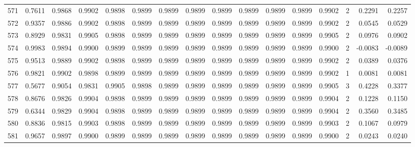 \begin{tabular}{lrrrrrrrrrrrrrrr}
571 &      0.7611 &  0.9868 &  0.9902 &  0.9898 &  0.9899 &  0.9899 &  0.9899 &  0.9899 &  0.9899 &  0.9899 &   0.9899 &     0.9902 &      2 &                    0.2291 &                     0.2257 \\
572 &      0.9357 &  0.9886 &  0.9902 &  0.9898 &  0.9899 &  0.9899 &  0.9899 &  0.9899 &  0.9899 &  0.9899 &   0.9899 &     0.9902 &      2 &                    0.0545 &                     0.0529 \\
573 &      0.8929 &  0.9831 &  0.9905 &  0.9898 &  0.9899 &  0.9899 &  0.9899 &  0.9899 &  0.9899 &  0.9899 &   0.9899 &     0.9905 &      2 &                    0.0976 &                     0.0902 \\
574 &      0.9983 &  0.9894 &  0.9900 &  0.9899 &  0.9899 &  0.9899 &  0.9899 &  0.9899 &  0.9899 &  0.9899 &   0.9899 &     0.9900 &      2 &                   -0.0083 &                    -0.0089 \\
575 &      0.9513 &  0.9889 &  0.9902 &  0.9898 &  0.9899 &  0.9899 &  0.9899 &  0.9899 &  0.9899 &  0.9899 &   0.9899 &     0.9902 &      2 &                    0.0389 &                     0.0376 \\
576 &      0.9821 &  0.9902 &  0.9898 &  0.9899 &  0.9899 &  0.9899 &  0.9899 &  0.9899 &  0.9899 &  0.9899 &   0.9899 &     0.9902 &      1 &                    0.0081 &                     0.0081 \\
577 &      0.5677 &  0.9054 &  0.9831 &  0.9905 &  0.9898 &  0.9899 &  0.9899 &  0.9899 &  0.9899 &  0.9899 &   0.9899 &     0.9905 &      3 &                    0.4228 &                     0.3377 \\
578 &      0.8676 &  0.9826 &  0.9904 &  0.9898 &  0.9899 &  0.9899 &  0.9899 &  0.9899 &  0.9899 &  0.9899 &   0.9899 &     0.9904 &      2 &                    0.1228 &                     0.1150 \\
579 &      0.6344 &  0.9829 &  0.9904 &  0.9898 &  0.9899 &  0.9899 &  0.9899 &  0.9899 &  0.9899 &  0.9899 &   0.9899 &     0.9904 &      2 &                    0.3560 &                     0.3485 \\
580 &      0.8836 &  0.9815 &  0.9903 &  0.9898 &  0.9899 &  0.9899 &  0.9899 &  0.9899 &  0.9899 &  0.9899 &   0.9899 &     0.9903 &      2 &                    0.1067 &                     0.0979 \\
581 &      0.9657 &  0.9897 &  0.9900 &  0.9899 &  0.9899 &  0.9899 &  0.9899 &  0.9899 &  0.9899 &  0.9899 &   0.9899 &     0.9900 &      2 &                    0.0243 &                     0.0240 \\

\end{tabular}
